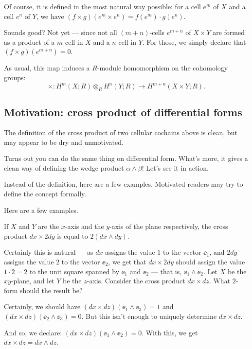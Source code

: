 Of course, it is defined in the most natural way possible: for a cell $e^m$ of $X$ and a cell $e^n$
of $Y$, we have $(f \times g)(e^m \times e^n) = f(e^m) \cdot g(e^n)$.

Sounds good? Not yet --- since not all $(m + n)$-cells $e^{m + n}$ of $X \times Y$
are formed as a product of a $m$-cell in $X$ and a $n$-cell in $Y$.
For those, we simply declare that $(f \times g)(e^{m + n}) = 0$.

As usual, this map induces a $R$-module homomorphism on the cohomology groups:
\[ \times \colon H^m(X; R) \otimes_R H^n(Y; R) \to H^{m + n}(X \times Y; R). \]

\subsection{Motivation: cross product of differential forms}

The definition of the cross product of two cellular cochains above is clean, but may appear to be
dry and unmotivated.

Turns out you can do the same thing on differential form.
What's more, it gives a clean way of defining the wedge product $\alpha \wedge \beta$!
Let's see it in action.

Instead of the definition, here are a few examples. Motivated readers may try to define the concept
formally.
\begin{example}
	Here are a few examples.
	\begin{itemize}
		\ii If $X$ and $Y$ are the $x$-axis and the $y$-axis of the plane respectively,
		the cross product $dx \times 2dy$ is equal to $2(dx \wedge dy)$.

		Certainly this is natural --- as $dx$ assigns the value $1$ to the vector $\ee_1$,
		and $2dy$ assigns the value $2$ to the vector $\ee_2$, we get that $dx \times 2dy$ should
		assign the value $1 \cdot 2 = 2$ to the unit square spanned by $\ee_1$ and $\ee_2$ --- that
		is, $\ee_1 \wedge \ee_2$.
		\ii Let $X$ be the $xy$-plane, and let $Y$ be the $z$-axis.
		Consider the cross product $dx \times dz$. What $2$-form should the result be?

		Certainly, we should have $(dx \times dz)(\ee_1 \wedge \ee_3) = 1$
		and $(dx \times dz)(\ee_2 \wedge \ee_3) = 0$.
		But this isn't enough to uniquely determine $dx \times dz$.

		And so, we declare: $(dx \times dz)(\ee_1 \wedge \ee_2) = 0$.
		With this, we get $dx \times dz = dx \wedge dz$.
	\end{itemize}
\end{example}

